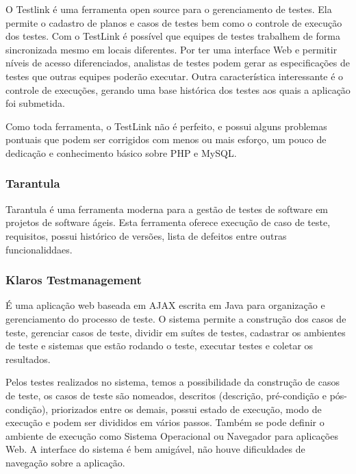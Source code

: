 \documentclass[12pt,a4paper]{article}
\begin{document}
			O Testlink é uma ferramenta open source para o gerenciamento de testes. Ela permite o cadastro de planos e casos de testes bem como o controle de execução dos testes. 
			Com o TestLink é possível que equipes de testes trabalhem de forma sincronizada mesmo em locais diferentes. 
			Por ter uma interface Web e permitir níveis de acesso diferenciados, analistas de testes podem gerar as especificações de testes que outras equipes poderão executar. 
			Outra característica interessante é o controle de execuções, gerando uma base histórica dos testes aos quais a aplicação foi submetida.
			
			Como toda ferramenta, o TestLink não é perfeito, e possui alguns problemas pontuais que podem ser corrigidos com menos ou mais esforço, um pouco de dedicação e conhecimento básico sobre PHP e MySQL.
		
		
		\subsubsection{Tarantula}
		
			Tarantula é uma ferramenta moderna para a gestão de testes de software em projetos de software ágeis. 
			Esta ferramenta oferece execução de caso de teste, requisitos, possui histórico de versões, lista de defeitos entre outras funcionaliddaes.
		
		
		\subsubsection{Klaros Testmanagement}
		
			É uma aplicação web baseada em AJAX escrita em Java para organização e gerenciamento do processo de teste. O sistema
			permite a construção dos casos de teste, gerenciar casos de teste, dividir em suítes de testes, cadastrar os
			ambientes de teste e sistemas que estão rodando o teste, executar testes e coletar os resultados.
			
			Pelos testes realizados no sistema, temos a possibilidade da construção de casos de teste, os casos de teste são
			nomeados, descritos (descrição, pré-condição e pós-condição), priorizados entre os demais, possui estado de
			execução, modo de execução e podem ser divididos em vários passos. Também se pode definir o ambiente de execução
			como Sistema Operacional ou Navegador para aplicações Web. A interface do sistema é bem amigável, não houve
			dificuldades de navegação sobre a aplicação.
			
\end{document}
